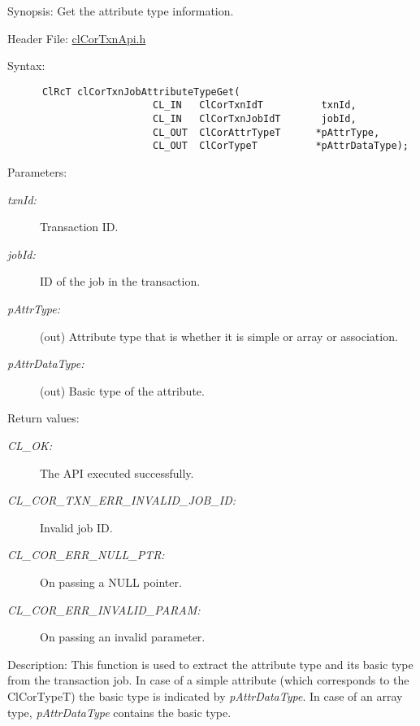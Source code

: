 \begin{Desc}
\item[Synopsis:]Get the attribute type information.\end{Desc}
\begin{Desc}
\item[Header File:]\hyperlink{cl_cor_txn_api_8h}{cl\-Cor\-Txn\-Api.h}\end{Desc}
\begin{Desc}
\item[Syntax:]

\footnotesize\begin{verbatim}      ClRcT clCorTxnJobAttributeTypeGet(
                         CL_IN   ClCorTxnIdT          txnId,
                         CL_IN   ClCorTxnJobIdT       jobId,
                         CL_OUT  ClCorAttrTypeT      *pAttrType,
                         CL_OUT  ClCorTypeT          *pAttrDataType); 
\end{verbatim}
\normalsize
\end{Desc}
\begin{Desc}
\item[Parameters:]
\begin{description}
\item[{\em txn\-Id:}]Transaction ID. \item[{\em job\-Id:}]ID of the job in the transaction. \item[{\em p\-Attr\-Type:}](out) Attribute type that is whether it is simple or array or association. \item[{\em p\-Attr\-Data\-Type:}](out) Basic type of the attribute.\end{description}
\end{Desc}
\begin{Desc}
\item[Return values:]
\begin{description}
\item[{\em CL\_\-OK:}]The API executed successfully. \item[{\em CL\_\-COR\_\-TXN\_\-ERR\_\-INVALID\_\-JOB\_\-ID:}]Invalid job ID. \item[{\em CL\_\-COR\_\-ERR\_\-NULL\_\-PTR:}]On passing a NULL pointer. \item[{\em CL\_\-COR\_\-ERR\_\-INVALID\_\-PARAM:}]On passing an invalid parameter.\end{description}
\end{Desc}
\begin{Desc}
\item[Description:]This function is used to extract the attribute type and its basic type from the transaction job. In case of a simple attribute (which corresponds to the Cl\-Cor\-Type\-T) the basic type is indicated by {\em p\-Attr\-Data\-Type\/}. In case of an array type, {\em p\-Attr\-Data\-Type\/} contains the basic type.\end{Desc}
